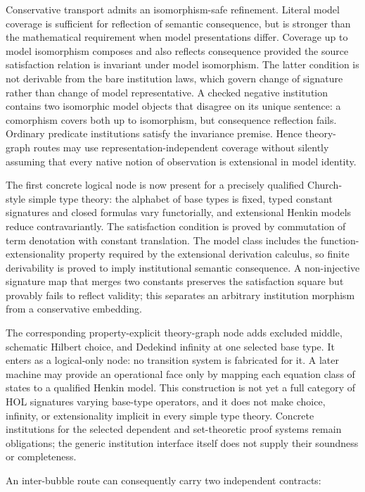 \documentclass[11pt]{article}
\theoremstyle{definition}
\theoremstyle{remark}
\begin{document}
Conservative transport admits an isomorphism-safe refinement.  Literal model
coverage is sufficient for reflection of semantic consequence, but is stronger
than the mathematical requirement when model presentations differ.  Coverage
up to model isomorphism composes and also reflects consequence provided the
source satisfaction relation is invariant under model isomorphism.  The latter
condition is not derivable from the bare institution laws, which govern change
of signature rather than change of model representative.  A checked negative
institution contains two isomorphic model objects that disagree on its unique
sentence: a comorphism covers both up to isomorphism, but consequence reflection
fails.  Ordinary predicate institutions satisfy the invariance premise.  Hence
theory-graph routes may use representation-independent coverage without silently
assuming that every native notion of observation is extensional in model
identity.

The first concrete logical node is now present for a precisely qualified
Church-style simple type theory: the alphabet of base types is fixed, typed
constant signatures and closed formulas vary functorially, and extensional
Henkin models reduce contravariantly.  The satisfaction condition is proved by
commutation of term denotation with constant translation.  The model class
includes the function-extensionality property required by the extensional
derivation calculus, so finite derivability is proved to imply institutional
semantic consequence.  A non-injective signature map that merges two constants
preserves the satisfaction square but provably fails to reflect validity; this
separates an arbitrary institution morphism from a conservative embedding.

The corresponding property-explicit theory-graph node adds excluded middle,
schematic Hilbert choice, and Dedekind infinity at one selected base type.  It
enters as a logical-only node: no transition system is fabricated for it.  A
later machine may provide an operational face only by mapping each equation
class of states to a qualified Henkin model.  This construction is not yet a
full category of HOL signatures varying base-type operators, and it does not
make choice, infinity, or extensionality implicit in every simple type theory.
Concrete institutions for the selected dependent and set-theoretic proof
systems remain obligations; the generic institution interface itself does not
supply their soundness or completeness.

An inter-bubble route can consequently carry two independent contracts:
\end{document}
